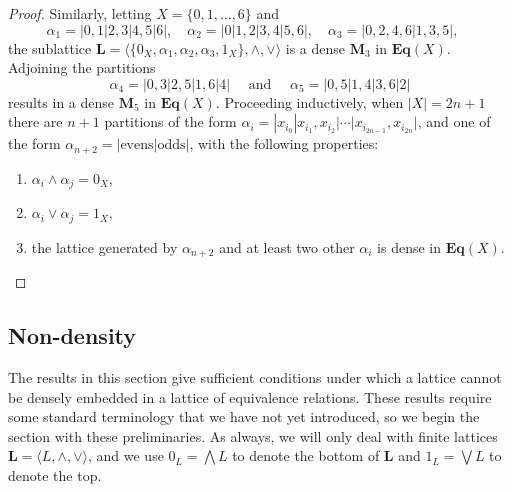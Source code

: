 \documentclass[cm,dissertation,actual,final]{uhthesis}
\theoremstyle{plain}
\theoremstyle{definition}
\theoremstyle{remark}
\numberwithin{theorem}{section}
\numberwithin{claim}{chapter}
\numberwithin{equation}{section}
\numberwithin{conjecture}{chapter}
\newcommand{\<}{\ensuremath{\langle}}
\renewcommand{\>}{\ensuremath{\rangle}}
\newcommand{\meet}{\ensuremath{\wedge}}
\newcommand{\join}{\ensuremath{\vee}}
\newcommand{\Meet}{\ensuremath{\bigwedge}}
\renewcommand{\Join}{\ensuremath{\bigvee}}
\newcommand{\bEqX}{\ensuremath{\mathbf{Eq}(X)}}
\newcommand{\0}{\ensuremath{\mathbf{0}}}
\newcommand{\1}{\ensuremath{\mathbf{1}}}
\newcommand{\2}{\ensuremath{\mathbf{2}}}
\newcommand{\3}{\ensuremath{\mathbf{3}}}
\newcommand{\4}{\ensuremath{\mathbf{4}}}
\newcommand{\5}{\ensuremath{\mathbf{5}}}
\newcommand{\bL}{\ensuremath{\mathbf{L}}}
\newcommand{\bM}{\ensuremath{\mathbf{M}}}
\begin{document}
\begin{proof}
Similarly, letting
$X =  \{0,1,\dots, 6\}$ and %
\[
\alpha_1 = |0,1|2,3|4,5|6|, \quad 
\alpha_2 = |0|1,2|3,4|5,6|, \quad 
\alpha_3 = |0,2,4,6|1,3,5|, \quad 
\]
the sublattice 
$\bL  = \<\{0_X, \alpha_1, \alpha_2, \alpha_3, 1_X\}, \meet, \join\>$ is a dense $\bM_3$ in
\bEqX. Adjoining the partitions
\[
\alpha_4 = |0,3|2,5|1,6|4| \quad \text{ and } \quad \alpha_5 = |0,5|1,4|3,6|2|
\]
results in a dense $\bM_5$ in \bEqX.
Proceeding inductively, when $|X| = 2n+1$ there are $n+1$ partitions of
the form $\alpha_i = |x_{i_0}|x_{i_1}, x_{i_2}| \cdots | x_{i_{2n-1}},x_{i_{2n}}|$,
and one of the form 
$\alpha_{n+2} = |\text{evens} | \text{odds}|$, with the following properties:
\begin{enumerate}
\item $\alpha_i \meet \alpha_j = 0_X$,
\item $\alpha_i \join \alpha_j = 1_X$,
\item the lattice generated by $\alpha_{n+2}$ and at least two other $\alpha_i$ is dense in $\bEqX$.
\end{enumerate}
\end{proof}

\subsection{Non-density}
\label{sec:non-density}
The results in this section give sufficient conditions under which a lattice
cannot be densely embedded in a lattice of equivalence relations. 
These results require some standard terminology that we have not yet introduced,
so we begin the section with these preliminaries.  As always, we will only deal
with finite lattices $\bL = \<L, \meet, \join\>$, and we use $0_L = \Meet L$ to
denote the bottom of $\bL$ and $1_L = \Join L$ to denote the top.
\end{document}
